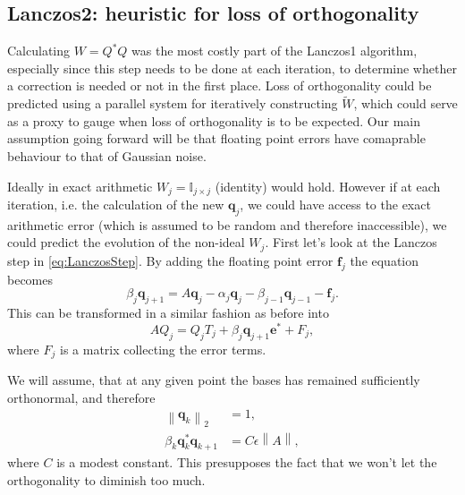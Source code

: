 \documentclass{article}
\begin{document}
	\FloatBarrier
	
	\subsection{Lanczos2: heuristic for loss of orthogonality}
	
	Calculating $W = Q^\ast Q$ was the most costly part of the Lanczos1 algorithm, especially since this step needs to be done at each iteration, to determine whether a correction is needed or not in the first place. Loss of orthogonality could be predicted using a parallel system for iteratively constructing $\tilde{W}$, which could serve as a proxy to gauge when loss of orthogonality is to be expected. Our main assumption going forward will be that floating point errors have comaprable behaviour to that of Gaussian noise.
	
	Ideally in exact arithmetic $W_j = \mathbb{I}_{j\times j}$ (identity) would hold. However if at each iteration, i.e. the calculation of the new $\textbf{q}_j$, we could have access to the exact arithmetic error (which is assumed to be random and therefore inaccessible), we could predict the evolution of the non-ideal $W_j$. First let's look at the Lanczos step in \autoref{eq:LanczosStep}. By adding the floating point error $\textbf{f}_j$
	the equation becomes
	\begin{equation}\label{eq:LanczosStep-f}
		\beta_j\mathbf{q}_{j+1}=A\mathbf{q}_j-\alpha_j\mathbf{q}_j-\beta_{j-1}\mathbf{q}_{j-1} - \textbf{f}_j.
	\end{equation}
	This can be transformed in a similar fashion as before into 
	\begin{equation}
		AQ_{j}=Q_jT_j+\beta_{j}\mathbf{q}_{j+1}\mathbf{e}^{\ast} + F_j,
	\end{equation}
	where $F_j$ is a matrix collecting the error terms.
	
	We will assume, that at any given point the bases has remained sufficiently orthonormal, and therefore 
	\begin{align}
		\left\lVert \textbf{q}_k \right\rVert_2 &= 1,\\
		\beta_{k} \textbf{q}_k^\ast \textbf{q}_{k+1} &= C \epsilon \left\lVert A \right\rVert,
	\end{align}
	where $C$ is a modest constant. This presupposes the fact that we won't let the orthogonality to diminish too much.
	
\end{document}
